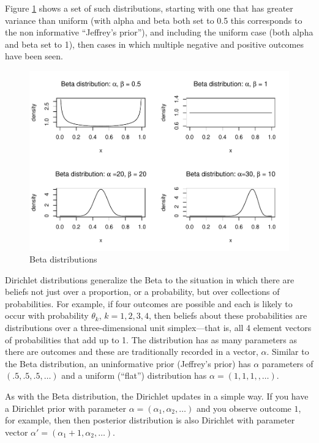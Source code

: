 \documentclass[
  12pt,
]{book}
\begin{document}
Figure \ref{fig:Betas} shows a set of such distributions, starting with one that has greater variance than uniform (with alpha and beta both set to 0.5 this corresponds to the non informative ``Jeffrey's prior''), and including the uniform case (both alpha and beta set to 1), then cases in which multiple negative and positive outcomes have been seen.

\begin{figure}

{\centering \includegraphics{ii_files/figure-latex/Betas-1} 

}

\caption{Beta distributions}\label{fig:Betas}
\end{figure}

Dirichlet distributions generalize the Beta to the situation in which there are beliefs not just over a proportion, or a probability, but over collections of probabilities. For example, if four outcomes are possible and each is likely to occur with probability \(\theta_k\), \(k=1,2,3,4\), then beliefs about these probabilities are distributions over a three-dimensional unit simplex---that is, all 4 element vectors of probabilities that add up to 1. The distribution has as many parameters as there are outcomes and these are traditionally recorded in a vector, \(\alpha\). Similar to the Beta distribution, an uninformative prior (Jeffrey's prior) has \(\alpha\) parameters of \((.5,.5,.5, \dots)\) and a uniform (``flat'') distribution has \(\alpha = (1,1,1,,\dots)\).

As with the Beta distribution, the Dirichlet updates in a simple way. If you have a Dirichlet prior with parameter \(\alpha = (\alpha_1, \alpha_2, \dots)\) and you observe outcome \(1\), for example, then then posterior distribution is also Dirichlet with parameter vector \(\alpha' = (\alpha_1+1, \alpha_2,\dots)\).
\end{document}
